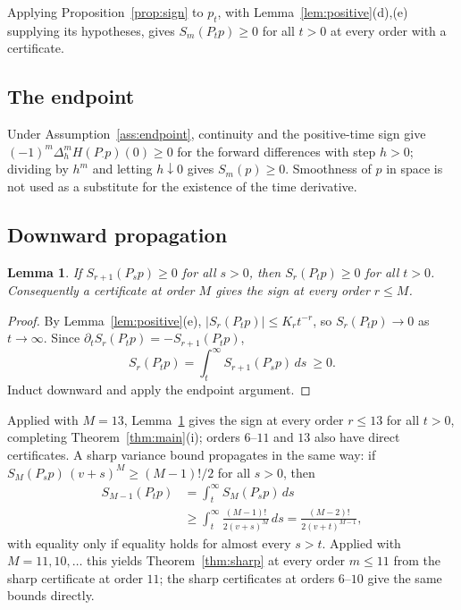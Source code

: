 \documentclass[11pt]{article}
\newtheorem{lemma}[theorem]{Lemma}
\theoremstyle{definition}
\theoremstyle{remark}
\begin{document}
Applying Proposition~\ref{prop:sign} to $p_t$, with Lemma~\ref{lem:positive}(d),(e)
supplying its hypotheses, gives $S_m(P_tp)\ge0$ for all $t>0$ at every order with a
certificate.

\subsection{The endpoint}\label{sec:endpoint}
Under Assumption~\ref{ass:endpoint}, continuity and the positive-time sign give
$(-1)^m\Delta_h^mH(P_\cdot p)(0)\ge0$ for the forward differences with step $h>0$;
dividing by $h^m$ and letting $h\downarrow0$ gives $S_m(p)\ge0$. Smoothness of $p$ in
space is not used as a substitute for the existence of the time derivative.

\subsection{Downward propagation}\label{sec:propagation}
\begin{lemma}\label{lem:propagation}
If $S_{r+1}(P_sp)\ge0$ for all $s>0$, then $S_r(P_tp)\ge0$ for all $t>0$.
Consequently a certificate at order $M$ gives the sign at every order $r\le M$.
\end{lemma}
\begin{proof}
By Lemma~\ref{lem:positive}(e), $|S_r(P_tp)|\le K_rt^{-r}$, so $S_r(P_tp)\to0$ as
$t\to\infty$. Since
$\partial_tS_r(P_tp)=-S_{r+1}(P_tp)$,
\[
 S_r(P_tp)=\int_t^\infty S_{r+1}(P_sp)\,ds\ \ge0 .
\]
Induct downward and apply the endpoint argument.
\end{proof}
Applied with $M=13$, Lemma~\ref{lem:propagation} gives the sign at every order
$r\le13$ for all $t>0$, completing Theorem~\ref{thm:main}(i); orders $6$--$11$ and
$13$ also have direct certificates. A sharp variance bound propagates in the same way:
if $S_M(P_sp)\,(v+s)^M\ge(M-1)!/2$ for all $s>0$, then
\begin{align*}
 S_{M-1}(P_tp)&=\int_t^\infty S_M(P_sp)\,ds\\
 &\ge\int_t^\infty\frac{(M-1)!}{2(v+s)^M}\,ds=\frac{(M-2)!}{2(v+t)^{M-1}},
\end{align*}
with equality only if equality holds for almost every $s>t$. Applied with
$M=11,10,\dots$ this yields Theorem~\ref{thm:sharp} at every order $m\le11$ from the
sharp certificate at order $11$; the sharp certificates at orders $6$--$10$ give the
same bounds directly.
\end{document}
